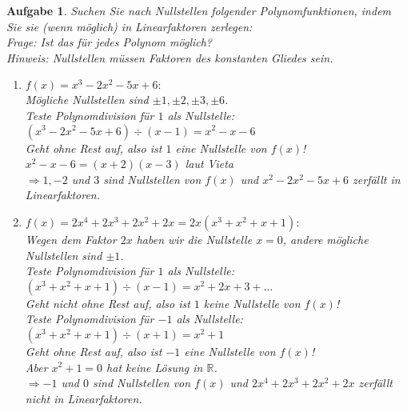 \documentclass[12pt]{article}
\newtheorem{exercise}[satz]{Aufgabe}
\begin{document}
\vspace{2cm}

\begin{exercise}
  Suchen Sie nach Nullstellen folgender Polynomfunktionen, indem Sie sie (wenn m\"oglich) in Linearfaktoren zerlegen:\\
  Frage: Ist das f\"ur jedes Polynom m\"oglich?\\
  Hinweis: Nullstellen m\"ussen Faktoren des konstanten Gliedes sein.
  \begin{enumerate}
    \item[(a)] $f(x) = x^3-2x^2-5x+6:$ \\
     M\"ogliche Nullstellen sind $\pm1,\pm2,\pm3,\pm6$.\\
     Teste Polynomdivision f\"ur $1$ als Nullstelle: \\
     $(x^3-2x^2-5x+6)\div(x-1)=x^2-x-6$\\
     Geht ohne Rest auf, also ist $1$ eine Nullstelle von $f(x)$!\\
     $x^2-x-6=(x+2)(x-3)$ laut Vieta\\
     $\Rightarrow 1,-2$ und $3$ sind Nullstellen von $f(x)$ und $x^2-2x^2-5x+6$ zerf\"allt in Linearfaktoren.
    \item[(b)] $f(x) = 2x^4+2x^3+2x^2+2x = 2x(x^3+x^2+x+1):$ \\
     Wegen dem Faktor $2x$ haben wir die Nullstelle $x=0$,
     andere m\"ogliche Nullstellen sind $\pm1$.\\
     Teste Polynomdivision f\"ur $1$ als Nullstelle: \\
     $(x^3+x^2+x+1)\div(x-1)=x^2+2x+3+\ldots$\\
     Geht nicht ohne Rest auf, also ist $1$ keine Nullstelle von $f(x)$!\\
     Teste Polynomdivision f\"ur $-1$ als Nullstelle: \\
     $(x^3+x^2+x+1)\div(x+1)=x^2+1$\\
     Geht ohne Rest auf, also ist $-1$ eine Nullstelle von $f(x)$!\\
     Aber $x^2+1=0$ hat keine L\"osung in $\mathbb{R}$.\\
     $\Rightarrow -1$ und $0$ sind Nullstellen von $f(x)$ und $2x^4+2x^3+2x^2+2x$ zerf\"allt nicht in Linearfaktoren. 
  \end{enumerate}
\end{exercise}

\vspace{0.1cm}
\end{document}
